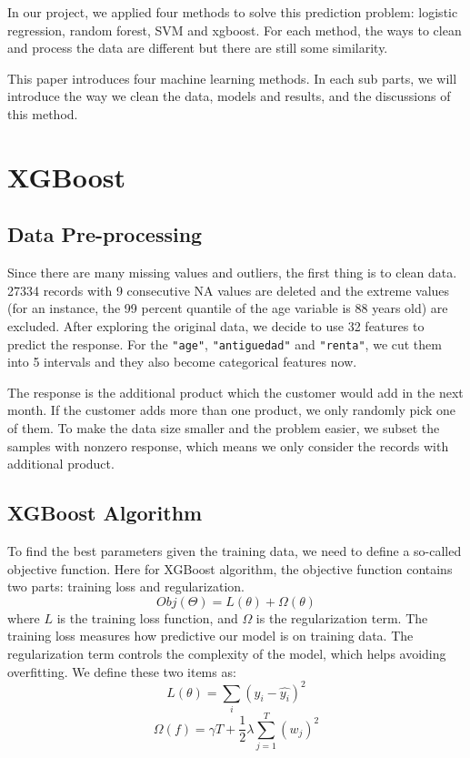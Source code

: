 \documentclass{article}
\begin{document}
\begin{spacing}{1}
\begin{large}
In our project, we applied four methods to solve this prediction problem: logistic regression, random forest, SVM and xgboost. For each method, the ways to clean and process the data are different but there are still some similarity.

This paper introduces four machine learning methods. In each sub parts, we will introduce the way we clean the data, models and results, and the discussions of this method.

\section{XGBoost}


\subsection{Data Pre-processing}

\noindent \indent Since there are many missing values and outliers, the first thing is to clean data. 27334 records with 9 consecutive NA values are deleted and the extreme values (for an instance, the 99 percent quantile of the age variable is 88 years old) are excluded. After exploring the original data, we decide to use 32 features to predict the response. For the \verb|"age"|, \verb|"antiguedad"| and \verb|"renta"|, we cut them into 5 intervals and they also become categorical features now. 

The response is the additional product which the customer would add in the next month. If the customer adds more than one product, we only randomly pick one of them. To make the data size smaller and the problem easier, we subset the samples with nonzero response, which means we only consider the records with additional product.

\subsection{XGBoost Algorithm}

\noindent \indent To find the best parameters given the training data, we need to define a so-called objective function. Here for XGBoost algorithm, the objective function contains two parts: training loss and regularization.
\[
Obj(\Theta) = L(\theta) + \Omega(\theta)
\]
where $L$ is the training loss function, and $\Omega$ is the regularization term. The training loss measures how predictive our model is on training data. The regularization term controls the complexity of the model, which helps avoiding overfitting. We define these two items as:
\[
L(\theta) = \sum_{i}(y_i - \hat{y_i})^2
\]
\[
\Omega(f) = \gamma T + \frac{1}{2}\lambda\sum_{j = 1}^{T}(w_j)^2
\]





\end{large}
\end{spacing}
\end{document}
